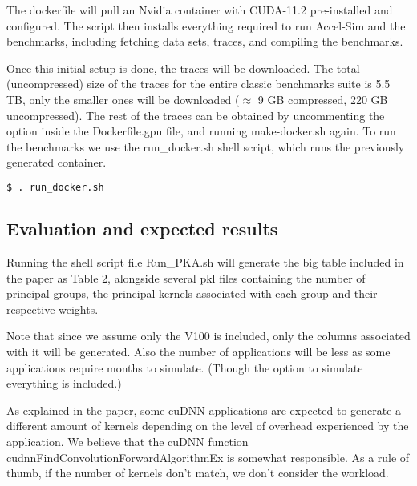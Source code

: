\documentclass{sigplanconf}
\begin{document}
{The dockerfile will pull an Nvidia container with CUDA-11.2 pre-installed and configured. 
The script then installs everything required to run Accel-Sim and the benchmarks, including 
fetching data sets, traces, and compiling the benchmarks. 

Once this initial setup is done, the traces will be downloaded. The total (uncompressed) size of 
the traces for the entire classic benchmarks suite is 5.5 TB, only the smaller ones will be downloaded 
($\approx$ 9 GB compressed, 220 GB uncompressed). The rest of the traces can be obtained by 
uncommenting the option inside the Dockerfile.gpu file, and running make-docker.sh again.
To run the benchmarks we use the run\_docker.sh shell script, which runs the previously generated container.

\begin{lstlisting}[language=bash]
  $ . run_docker.sh
\end{lstlisting}




\subsection{Evaluation and expected results}

Running the shell script file Run\_PKA.sh will generate the big table included in the paper as Table 2,
alongside several pkl files containing the number of principal groups, the principal kernels associated
with each group and their respective weights.

Note that since we assume only the V100 is included, only the columns associated with it will be 
generated. Also the number of applications will be less as some applications require 
months to simulate. (Though the option to simulate everything is included.)

As explained in the paper, some cuDNN applications are expected to generate a different amount of kernels
depending on the level of overhead experienced by the application. We believe that the cuDNN function 
cudnnFindConvolutionForwardAlgorithmEx is somewhat responsible. As a rule of thumb, if the number 
of kernels don't match, we don't consider the workload.


}
\end{document}
